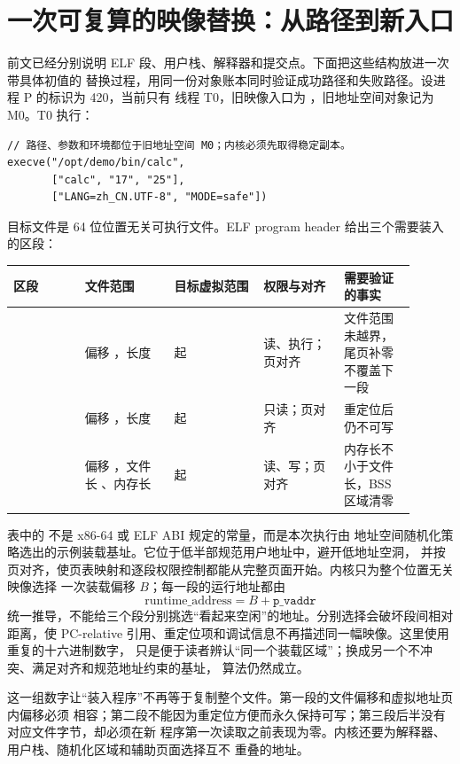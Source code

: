 \section{一次可复算的映像替换：从路径到新入口}

前文已经分别说明 ELF 段、用户栈、解释器和提交点。下面把这些结构放进一次带具体初值的
替换过程，用同一份对象账本同时验证成功路径和失败路径。设进程 P 的标识为 420，当前只有
线程 T0，旧映像入口为 ，旧地址空间对象记为 M0。T0 执行：

\begin{lstlisting}
// 路径、参数和环境都位于旧地址空间 M0；内核必须先取得稳定副本。
execve("/opt/demo/bin/calc",
       ["calc", "17", "25"],
       ["LANG=zh_CN.UTF-8", "MODE=safe"])
\end{lstlisting}

目标文件是 64 位位置无关可执行文件。ELF program header 给出三个需要装入的区段：

\begin{longtable}{|L{0.16\linewidth}|L{0.20\linewidth}|L{0.20\linewidth}|L{0.18\linewidth}|L{0.16\linewidth}|}
\hline
区段 & 文件范围 & 目标虚拟范围 & 权限与对齐 & 需要验证的事实 \\ \hline
{} & 偏移 ，长度  &
 起 & 读、执行；页对齐 &
文件范围未越界，尾页补零不覆盖下一段 \\\tablerowrule
{} & 偏移 ，长度  &
 起 & 只读；页对齐 &
重定位后仍不可写 \\\tablerowrule
{} & 偏移 ，文件长 、内存长  &
 起 & 读、写；页对齐 &
内存长不小于文件长，BSS 区域清零 \\ \hline
\end{longtable}

表中的  不是 x86-64 或 ELF ABI 规定的常量，而是本次执行由
地址空间随机化策略选出的示例装载基址。它位于低半部规范用户地址中，避开低地址空洞，
并按页对齐，使页表映射和逐段权限控制都能从完整页面开始。内核只为整个位置无关映像选择
一次装载偏移 \(B\)；每一段的运行地址都由
\[
  \text{runtime\_address}=B+\texttt{p\_vaddr}
\]
统一推导，不能给三个段分别挑选“看起来空闲”的地址。分别选择会破坏段间相对距离，使
PC-relative 引用、重定位项和调试信息不再描述同一幅映像。这里使用重复的十六进制数字，
只是便于读者辨认“同一个装载区域”；换成另一个不冲突、满足对齐和规范地址约束的基址，
算法仍然成立。

这一组数字让“装入程序”不再等于复制整个文件。第一段的文件偏移和虚拟地址页内偏移必须
相容；第二段不能因为重定位方便而永久保持可写；第三段后半没有对应文件字节，却必须在新
程序第一次读取之前表现为零。内核还要为解释器、用户栈、随机化区域和辅助页面选择互不
重叠的地址。

